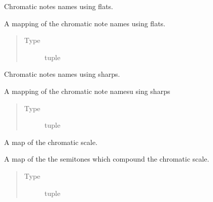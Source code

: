 \documentclass[letterpaper,10pt,english]{sphinxmanual}
\begin{document}
\begin{fulllineitems}
\label{\detokenize{birdears:birdears.CHROMATIC_FLAT}}
Chromatic notes names using flats.

A mapping of the chromatic note names using flats.
\begin{quote}\begin{description}
\item[{Type}] \leavevmode
tuple

\end{description}\end{quote}

\end{fulllineitems}


\begin{fulllineitems}
\label{\detokenize{birdears:birdears.CHROMATIC_SHARP}}
Chromatic notes names using sharps.

A mapping of the chromatic note namesu sing sharps
\begin{quote}\begin{description}
\item[{Type}] \leavevmode
tuple

\end{description}\end{quote}

\end{fulllineitems}


\begin{fulllineitems}
\label{\detokenize{birdears:birdears.CHROMATIC_TYPE}}
A map of the chromatic scale.

A map of the the semitones which compound the chromatic scale.
\begin{quote}\begin{description}
\item[{Type}] \leavevmode
tuple

\end{description}\end{quote}

\end{fulllineitems}
\end{document}

